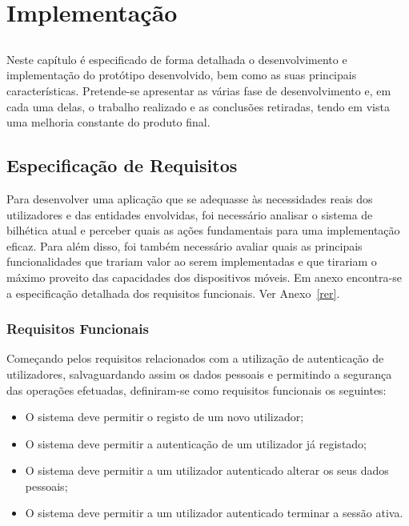 \chapter{Implementação}\label{chap:implement}

\section*{}

Neste capítulo é especificado de forma detalhada o desenvolvimento e implementação do protótipo desenvolvido, bem como as suas principais características. Pretende-se apresentar as várias fase de desenvolvimento e, em cada uma delas, o trabalho realizado e as conclusões retiradas, tendo em vista uma melhoria constante do produto final.

\section{Especificação de Requisitos}

Para desenvolver uma aplicação que se adequasse às necessidades reais dos utilizadores e das entidades envolvidas, foi necessário analisar o sistema de bilhética atual e perceber quais as ações fundamentais para uma implementação eficaz. Para além disso, foi também necessário avaliar quais as principais funcionalidades que trariam valor ao serem implementadas e que tirariam o máximo proveito das capacidades dos dispositivos móveis. Em anexo encontra-se a especificação detalhada dos requisitos funcionais. Ver Anexo~\ref{rer}.

\subsection{Requisitos Funcionais}

Começando pelos requisitos relacionados com a utilização de autenticação de utilizadores, salvaguardando assim os dados pessoais e permitindo a segurança das operações efetuadas, definiram-se como requisitos funcionais os seguintes:
\begin{itemize}
\item O sistema deve permitir o registo de um novo utilizador;
\item O sistema deve permitir a autenticação de um utilizador já registado;
\item O sistema deve permitir a um utilizador autenticado alterar os seus dados pessoais;
\item O sistema deve permitir a um utilizador autenticado terminar a sessão ativa.
\end{itemize}

